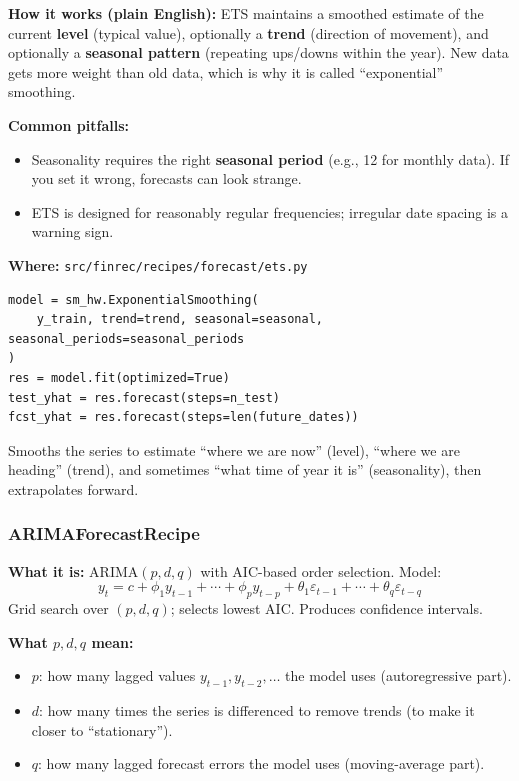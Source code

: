 \documentclass[11pt,a4paper]{article}
\begin{document}
\textbf{How it works (plain English):} ETS maintains a smoothed estimate of the current \textbf{level} (typical value), optionally a \textbf{trend} (direction of movement), and optionally a \textbf{seasonal pattern} (repeating ups/downs within the year). New data gets more weight than old data, which is why it is called ``exponential'' smoothing.

\textbf{Common pitfalls:}
\begin{itemize}[leftmargin=2em]
  \item Seasonality requires the right \textbf{seasonal period} (e.g., 12 for monthly data). If you set it wrong, forecasts can look strange.
  \item ETS is designed for reasonably regular frequencies; irregular date spacing is a warning sign.
\end{itemize}

\textbf{Where:} \texttt{src/finrec/recipes/forecast/ets.py}

\begin{lstlisting}
model = sm_hw.ExponentialSmoothing(
    y_train, trend=trend, seasonal=seasonal, seasonal_periods=seasonal_periods
)
res = model.fit(optimized=True)
test_yhat = res.forecast(steps=n_test)
fcst_yhat = res.forecast(steps=len(future_dates))
\end{lstlisting}

\begin{intuitionbox}
Smooths the series to estimate ``where we are now'' (level), ``where we are heading'' (trend), and sometimes ``what time of year it is'' (seasonality), then extrapolates forward.
\end{intuitionbox}

\subsubsection{ARIMAForecastRecipe}\label{sec:arima}

\textbf{What it is:} ARIMA$(p,d,q)$ with AIC-based order selection. Model:
\[
y_t = c + \phi_1 y_{t-1} + \cdots + \phi_p y_{t-p} + \theta_1 \varepsilon_{t-1} + \cdots + \theta_q \varepsilon_{t-q}
\]
Grid search over $(p,d,q)$; selects lowest AIC. Produces confidence intervals.

\textbf{What \(p,d,q\) mean:}
\begin{itemize}[leftmargin=2em]
  \item \(p\): how many lagged values \(y_{t-1}, y_{t-2}, \dots\) the model uses (autoregressive part).
  \item \(d\): how many times the series is differenced to remove trends (to make it closer to ``stationary'').
  \item \(q\): how many lagged forecast errors the model uses (moving-average part).
\end{itemize}
\end{document}
